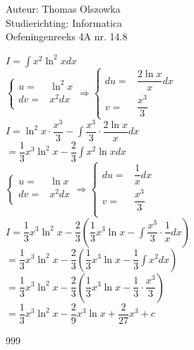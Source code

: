 \documentclass[a4paper]{article}
\newcommand{\dint}{\displaystyle\int}
\begin{document}
\noindent \large Auteur: Thomas Olszowka \\
\noindent \large Studierichting: Informatica \\
\noindent \large Oefeningenreeks 4A nr. 14.8  \\



\medskip

\normalsize

$I = \dint x^2 \ln^2 x dx$ \\

$\left\{\begin{array}{cc}
    u =& \ln^2 x \\ 
    dv =& x^2 dx \\ 
\end{array}\right. \Rightarrow\left\{\begin{array}{cc}
    du =& \dfrac{2 \ln x}{x} dx \\
    v =& \dfrac{x^3}{3} 
\end{array}\right.$ \\

$I = \ln^2 x \cdot \dfrac{x^3}{3} - \dint \dfrac{x^3}{3} \cdot \dfrac{2 \ln x}{x} dx$ \\

$= \dfrac{1}{3}x^3 \ln^2 x - \dfrac{2}{3} \dint x^2 \ln x dx$ \\

$\left\{\begin{array}{cc}
    u =& \ln x \\ 
    dv =& x^2 dx \\ 
\end{array}\right. \Rightarrow\left\{\begin{array}{cc}
    du =& \dfrac{1}{x} dx \\
    v =& \dfrac{x^3}{3} \\
\end{array}\right.$ \\

$I = \dfrac{1}{3}x^3 \ln^2 x - \dfrac{2}{3} \left(\dfrac{1}{3}x^3 \ln x - \dint \dfrac{x^3}{3} \cdot \dfrac{1}{x} dx \right) $ \\

$= \dfrac{1}{3}x^3 \ln^2 x - \dfrac{2}{3} \left(\dfrac{1}{3}x^3 \ln x - \dfrac{1}{3} \dint x^2 dx \right) $ \\

$= \dfrac{1}{3}x^3 \ln^2 x - \dfrac{2}{3} \left(\dfrac{1}{3}x^3 \ln x - \dfrac{1}{3} \cdot \dfrac{x^3}{3} \right)$ \\

$= \dfrac{1}{3}x^3 \ln^2 x - \dfrac{2}{9}x^3 \ln x + \dfrac{2}{27}x^3 + c $ \\


\begin{thebibliography}{999}
\end{thebibliography}
\end{document}
